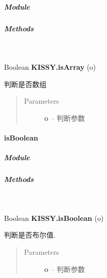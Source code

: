 \documentclass[letterpaper,10pt,english]{sphinxmanual}
\begin{document}
\subparagraph{Module}
\label{api/seed/lang/isArray:module}\begin{quote}

{\hyperref[api/seed/lang/index:module-Lang]{}}
\end{quote}


\subparagraph{Methods}
\label{api/seed/lang/isArray:methods}

\begin{fulllineitems}
\label{api/seed/lang/isArray:Lang.KISSY.isArray}~
\begin{DUlineblock}{0em}
\item[] Boolean \textbf{KISSY.isArray} (o)
\item[] 判断是否数组
\end{DUlineblock}
\begin{quote}\begin{description}
\item[{Parameters}] \leavevmode
\textbf{o} -- 判断参数

\end{description}\end{quote}

\end{fulllineitems}



\paragraph{isBoolean}
\label{api/seed/lang/isBoolean::doc}\label{api/seed/lang/isBoolean:isboolean}

\subparagraph{Module}
\label{api/seed/lang/isBoolean:module}\begin{quote}

{\hyperref[api/seed/lang/index:module-Lang]{}}
\end{quote}


\subparagraph{Methods}
\label{api/seed/lang/isBoolean:methods}

\begin{fulllineitems}
\label{api/seed/lang/isBoolean:Lang.KISSY.isBoolean}~
\begin{DUlineblock}{0em}
\item[] Boolean \textbf{KISSY.isBoolean} (o)
\item[] 判断是否布尔值.
\end{DUlineblock}
\begin{quote}\begin{description}
\item[{Parameters}] \leavevmode
\textbf{o} -- 判断参数

\end{description}\end{quote}

\end{fulllineitems}
\end{document}

